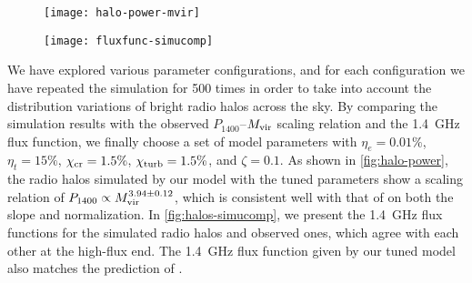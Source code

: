 \begin{figure}[htp]
  \centering
  \texttt{[image: halo-power-mvir]}
  \label{fig:halo-power}
\end{figure}

\begin{figure}[htp]
  \centering
  \texttt{[image: fluxfunc-simucomp]}
  \label{fig:halos-simucomp}
\end{figure}

We have explored various parameter configurations,
and for each configuration we have repeated the simulation for 500 times
in order to take into account the distribution variations of bright
radio halos across the sky.
By comparing the simulation results with the observed
$P_{1400}$--$M_{\mathrm{vir}}$ scaling relation and the \SI{1.4}{\GHz} flux
function, we finally choose a set of model parameters with
$\eta_e = 0.01\%$,
$\eta_t = 15\%$,
$\chi_{\mathrm{cr}} = 1.5\%$,
$\chi_{\mathrm{turb}} = 1.5\%$,
and $\zeta = 0.1$.
As shown in \autoref{fig:halo-power}, the radio halos simulated by our
model with the tuned parameters show a scaling relation of $P_{1400}
\propto M_{\mathrm{vir}}^{3.94 \pm 0.12}$, which is consistent well with that of
 on both the slope and normalization.
In \autoref{fig:halos-simucomp}, we present the \SI{1.4}{\GHz} flux
functions for the simulated radio halos and observed ones, which agree with
each other at the high-flux end.
The \SI{1.4}{\GHz} flux function given by our tuned model also matches
the prediction of .

